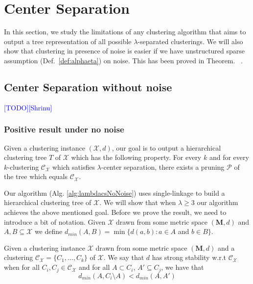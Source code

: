 \documentclass[anon,12pt]{colt2016} %
\newcommand{\mc}{\mathcal}
\newcommand{\mb}{\mathbf}
\newcommand{\todo}{\textcolor{blue}{[TODO]}\xspace}
\newcommand{\shrinu}{\textcolor{blue}{[Shrinu]}\xspace}
\begin{document}

\section{Center Separation}
\label{sec:cs}
 In this section, we study the limitations of any clustering algorithm that aims to output a tree representation of all possible {$\lambda$}-separated clusterings. We will also show that clustering in presence of noise is easier if we have unstructured sparse assumption (Def.~\ref{def:alphaeta}) on noise. This has been proved in Theorem.~ .
 
 
 \subsection{Center Separation without noise}
 \label{sec:cswithout}
\todo\shrinu


\subsubsection{Positive result under no noise}
Given a clustering instance $(\mc X, d)$, our goal is to output a hierarchical clustering tree $T$ of $\mc X$ which has the following property. For every $k$ and for every $k$-clustering $\mc C_{\mc X}$ which satisfies $\lambda$-center separation, there exists a pruning $\mc P$ of the tree which equals $\mc C_{\mc X}$. 

Our algorithm (Alg. \ref{alg:lambdacsNoNoise}) uses single-linkage to build a hierarchical clustering tree of $\mc X$. We will show that when $\lambda \ge 3$ our algorithm achieves the above mentioned goal. Before we prove the result, we need to introduce a bit of notation. Given $\mc X$ drawn from some metric space $(\mb M, d)$ and $A, B \subseteq \mc X$ we define $d_{min}(A, B) = \min \{d(a, b): a \in A$ and $b \in B\}$.
\begin{definition}
Given a clustering instance $\mc X$ drawn from some metric space $(\mb M, d)$ and a clustering $\mc C_{\mc X} = \{C_1, \ldots, C_k\}$ of $\mc X$. We say that $d$ has strong stability w.r.t $\mc C_{\mc X}$ when for all $C_i, C_j \in \mc C_{\mc X}$ and for all $A \subset C_i$, $A' \subseteq C_j$, we have that 
$$d_{min}(A, C_i\setminus A) < d_{min}(A, A')$$
\end{definition}
\end{document}
